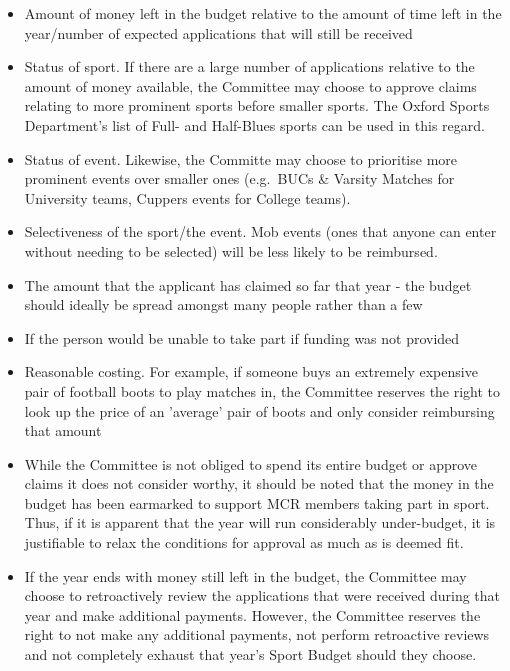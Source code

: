 \begin{itemize}
	\item Amount of money left in the budget relative to the amount of time left in the year/number of expected applications that will still be received
	\item Status of sport. If there are a large number of applications relative to the amount of money available, the Committee may choose to approve claims relating to more prominent sports before smaller sports. The Oxford Sports Department's list of Full- and Half-Blues sports can be used in this regard.
	\item Status of event. Likewise, the Committe may choose to prioritise more prominent events over smaller ones (e.g.\ BUCs \& Varsity Matches for University teams, Cuppers events for College teams).
	\item Selectiveness of the sport/the event. Mob events (ones that anyone can enter without needing to be selected) will be less likely to be reimbursed.
	\item The amount that the applicant has claimed so far that year - the budget should ideally be spread amongst many people rather than a few
	\item If the person would be unable to take part if funding was not provided
	\item Reasonable costing. For example, if someone buys an extremely expensive pair of football boots to play matches in, the Committee reserves the right to look up the price of an 'average' pair of boots and only consider reimbursing that amount
	\item While the Committee is not obliged to spend its entire budget or approve claims it does not consider worthy, it should be noted that the money in the budget has been earmarked to support MCR members taking part in sport. Thus, if it is apparent that the year will run considerably under-budget, it is justifiable to relax the conditions for approval as much as is deemed fit.
	\item If the year ends with money still left in the budget, the Committee may choose to retroactively review the applications that were received during that year and make additional payments. However, the Committee reserves the right to not make any additional payments, not perform retroactive reviews and not completely exhaust that year's Sport Budget should they choose.
\end{itemize}

